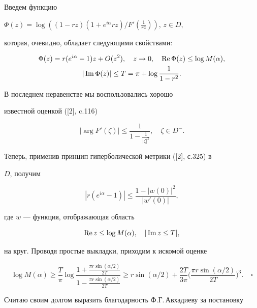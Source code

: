 Введем функцию


$\Phi(z)=\log\left((1-rz)(1+e^{i\alpha}rz)/


F'\left(\frac{1}{rz}\right)\right)$, $z \in D$,


которая, очевидно, обладает следующими свойствами:


\begin{gather*}


\Phi(z)=r(e^{i\alpha}-1)z+O(z^2), \quad z \to 0, \quad


\re\Phi(z) \leq \log M(\alpha),\\


%


|\im\Phi(z)| \leq T= \pi+\log\frac{1}{1-r^2}.


\end{gather*}


В последнем неравенстве мы воспользовались хорошо


известной оценкой ([2], c.116)


$$ |\arg F'(\zeta)|


\leq \frac{1}{1-\frac{1}{|\zeta|^2}}, \quad \zeta \in D^-.


$$


Теперь, применив принцип гиперболической метрики ([2], с.325) в


$D$, получим


$$


|r(e^{i\alpha}-1)| \leq \frac{1-|w(0)|^2}{|w'(0)|},


$$


где $w$ --- функция, отображающая область


$$


\re z \leq \log M(\alpha), \quad |\im z \leq T|,


$$


на круг. Проводя простые выкладки, приходим к искомой оценке


$$


\log M(\alpha) \ge\frac{T}{\pi}


\log\frac{1+\frac{\pi r \sin(\alpha/2)}{2T}}


{1-\frac{\pi r \sin(\alpha/2)}{2T}} \ge


r\sin(\alpha/2)+\frac{2T}{3\pi}\bigg(\frac


{\pi r \sin(\alpha/2)}{2T}\bigg)^3.\quad\square


$$





Считаю своим долгом выразить благодарность Ф.Г.\,Авхадиеву за постановку


